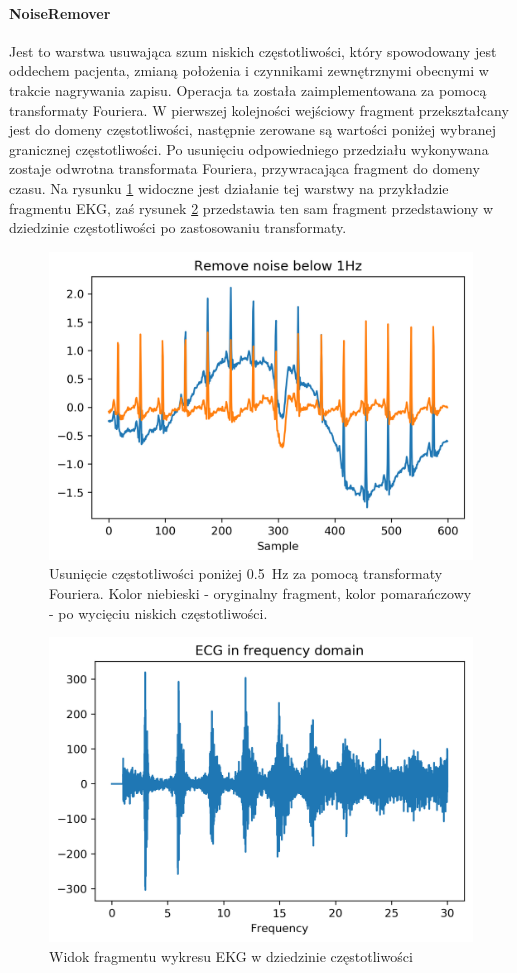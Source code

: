 \documentclass[polish,12pt]{aghthesis}
\begin{document}
\paragraph{NoiseRemover} Jest to warstwa usuwająca szum niskich częstotliwości, który spowodowany jest oddechem pacjenta, zmianą położenia i czynnikami zewnętrznymi obecnymi w trakcie nagrywania zapisu. Operacja ta została zaimplementowana za pomocą transformaty Fouriera. W pierwszej kolejności wejściowy fragment przekształcany jest do domeny częstotliwości, następnie zerowane są wartości poniżej wybranej granicznej częstotliwości. Po usunięciu odpowiedniego przedziału wykonywana zostaje odwrotna transformata Fouriera, przywracająca fragment do domeny czasu. Na rysunku \ref{fig:fft} widoczne jest działanie tej warstwy na przykładzie fragmentu EKG, zaś rysunek \ref{fig:fft_f} przedstawia ten sam fragment przedstawiony w dziedzinie częstotliwości po zastosowaniu transformaty.

\begin{figure}[h!]
	\centering
	\captionsetup{justification=centering}
	\includegraphics[width=0.6\linewidth]{noise_remove.png}
	\caption{Usunięcie częstotliwości poniżej \SI{0,5}{\hertz} za pomocą transformaty Fouriera. Kolor niebieski - oryginalny fragment, kolor pomarańczowy - po wycięciu niskich częstotliwości.}
	\label{fig:fft}
\end{figure}

\begin{figure}[h!]
	\centering
	\captionsetup{justification=centering}
	\includegraphics[width=0.6\linewidth]{fft_fdomain.png}
	\caption{Widok fragmentu wykresu EKG w dziedzinie częstotliwości}
	\label{fig:fft_f}
\end{figure}
\end{document}
